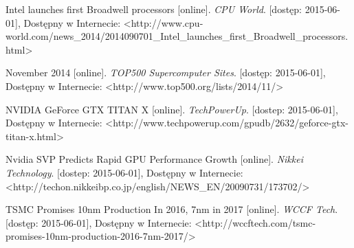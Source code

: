 \documentclass[12pt,a4paper,twoside]{article}
\begin{document}
\begin{thebibliography}{99}
 Intel launches first Broadwell processors [online]. \textit{CPU World}. [dostęp: 2015-06-01], Dostępny w Internecie: <http://www.cpu-world.com/news\_2014/2014090701\_Intel\_launches\_first\_Broadwell\_processors.html>

 November 2014 [online]. \textit{TOP500 Supercomputer Sites}. [dostęp: 2015-06-01], Dostępny w Internecie: <http://www.top500.org/lists/2014/11/>

 NVIDIA GeForce GTX TITAN X [online]. \textit{TechPowerUp}. [dostep: 2015-06-01], Dostępny w Internecie: <http://www.techpowerup.com/gpudb/2632/geforce-gtx-titan-x.html>

 Nvidia SVP Predicts Rapid GPU Performance Growth [online]. \textit{Nikkei Technology}. [dostep: 2015-06-01], Dostępny w Internecie: <http://techon.nikkeibp.co.jp/english/NEWS\_EN/20090731/173702/>

 TSMC Promises 10nm Production In 2016, 7nm in 2017 [online]. \textit{WCCF Tech}. [dostęp: 2015-06-01], Dostępny w Internecie: <http://wccftech.com/tsmc-promises-10nm-production-2016-7nm-2017/>

\end{thebibliography}
\endgroup
\end{document}
